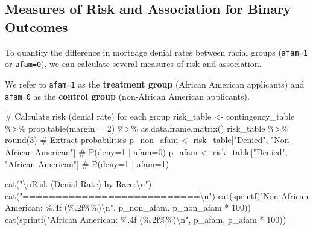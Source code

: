 \documentclass[
  12pt,
  a4paper,
]{scrbook}
\newenvironment{Shaded}{\begin{snugshade}}{\end{snugshade}}
\newcommand{\AttributeTok}[1]{\textcolor[rgb]{0.40,0.45,0.13}{#1}}
\newcommand{\CommentTok}[1]{\textcolor[rgb]{0.37,0.37,0.37}{#1}}
\newcommand{\DecValTok}[1]{\textcolor[rgb]{0.68,0.00,0.00}{#1}}
\newcommand{\FunctionTok}[1]{\textcolor[rgb]{0.28,0.35,0.67}{#1}}
\newcommand{\NormalTok}[1]{\textcolor[rgb]{0.00,0.23,0.31}{#1}}
\newcommand{\OtherTok}[1]{\textcolor[rgb]{0.00,0.23,0.31}{#1}}
\newcommand{\SpecialCharTok}[1]{\textcolor[rgb]{0.37,0.37,0.37}{#1}}
\newcommand{\StringTok}[1]{\textcolor[rgb]{0.13,0.47,0.30}{#1}}
\theoremstyle{plain}
\theoremstyle{definition}
\theoremstyle{remark}
\begin{document}
\subsection{Measures of Risk and Association for Binary
Outcomes}\label{measures-of-risk-and-association-for-binary-outcomes}

To quantify the difference in mortgage denial rates between racial
groups (\texttt{afam=1} or \texttt{afam=0}), we can calculate several
measures of risk and association.

We refer to \texttt{afam=1} as the \textbf{treatment group} (African
American applicants) and \texttt{afam=0} as the \textbf{control group}
(non-African American applicants).

\begin{Shaded}
\begin{Highlighting}[]
\CommentTok{\# Calculate risk (denial rate) for each group}
\NormalTok{risk\_table }\OtherTok{\textless{}{-}}\NormalTok{ contingency\_table }\SpecialCharTok{\%\textgreater{}\%}
    \FunctionTok{prop.table}\NormalTok{(}\AttributeTok{margin =} \DecValTok{2}\NormalTok{) }\SpecialCharTok{\%\textgreater{}\%}
    \FunctionTok{as.data.frame.matrix}\NormalTok{()}
\NormalTok{risk\_table }\SpecialCharTok{\%\textgreater{}\%} \FunctionTok{round}\NormalTok{(}\DecValTok{3}\NormalTok{)}
\CommentTok{\# Extract probabilities}
\NormalTok{p\_non\_afam }\OtherTok{\textless{}{-}}\NormalTok{ risk\_table[}\StringTok{"Denied"}\NormalTok{, }\StringTok{"Non{-}African American"}\NormalTok{] }\CommentTok{\# P(deny=1 | afam=0)}
\NormalTok{p\_afam }\OtherTok{\textless{}{-}}\NormalTok{ risk\_table[}\StringTok{"Denied"}\NormalTok{, }\StringTok{"African American"}\NormalTok{] }\CommentTok{\# P(deny=1 | afam=1)}

\FunctionTok{cat}\NormalTok{(}\StringTok{"}\SpecialCharTok{\textbackslash{}n}\StringTok{Risk (Denial Rate) by Race:}\SpecialCharTok{\textbackslash{}n}\StringTok{"}\NormalTok{)}
\FunctionTok{cat}\NormalTok{(}\StringTok{"===========================}\SpecialCharTok{\textbackslash{}n}\StringTok{"}\NormalTok{)}
\FunctionTok{cat}\NormalTok{(}\FunctionTok{sprintf}\NormalTok{(}\StringTok{"Non{-}African American: \%.4f (\%.2f\%\%)}\SpecialCharTok{\textbackslash{}n}\StringTok{"}\NormalTok{, p\_non\_afam, p\_non\_afam }\SpecialCharTok{*} \DecValTok{100}\NormalTok{))}
\FunctionTok{cat}\NormalTok{(}\FunctionTok{sprintf}\NormalTok{(}\StringTok{"African American:     \%.4f (\%.2f\%\%)}\SpecialCharTok{\textbackslash{}n}\StringTok{"}\NormalTok{, p\_afam, p\_afam }\SpecialCharTok{*} \DecValTok{100}\NormalTok{))}
\end{Highlighting}
\end{Shaded}
\end{document}
